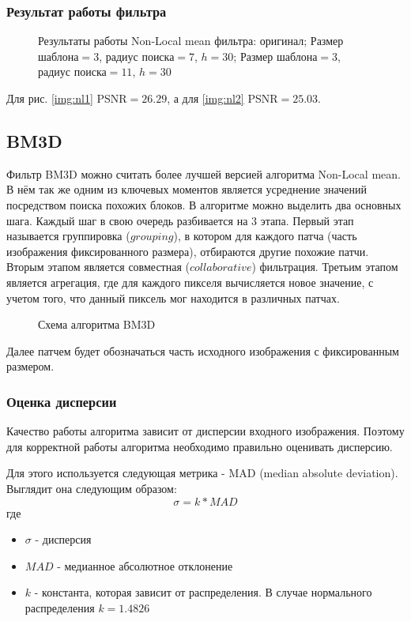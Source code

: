 \subsubsection{Результат работы фильтра}
\begin{figure}[H]
	\centering
	\hspace{0.0125ex}
	\subfigure[]{\texttt{[image: nl1]}
		\label{img:nl1}
	}
	\hspace{0.0125ex}
	\subfigure[]{\texttt{[image: nl2]}
		\label{img:nl2}
	}
	\caption{Результаты работы Non-Local mean фильтра:  оригинал;   Размер шаблона$=3$, радиус поиска$=7$, $h=30$;  Размер шаблона$=3$, радиус поиска$=11$, $h=30$}
	\label{img:nlRes}
\end{figure}
Для рис. \ref{img:nl1} PSNR$=26.29$, а для \ref{img:nl2} PSNR$=25.03$.

\subsection{BM3D}
Фильтр BM3D можно считать более лучшей версией алгоритма Non-Local mean. В нём так же одним из ключевых моментов является
усреднение значений посредством поиска похожих блоков. В алгоритме можно выделить два основных шага. Каждый шаг в свою очередь разбивается на 3 этапа. Первый этап называется группировка ($grouping$), в котором для каждого патча (часть изображения фиксированного размера), отбираются другие похожие патчи. Вторым этапом является совместная ($collaborative$) фильтрация. Третьим этапом является агрегация, где для каждого пикселя вычисляется новое значение, с учетом того, что данный пиксель мог находится в различных патчах\cite{Hasan2018}.
\begin{figure}[H]
	\caption{Схема алгоритма BM3D\cite{bm3dCircuit}}
\end{figure}
Далее патчем будет обозначаться часть исходного изображения с фиксированным размером.
\subsubsection{Оценка дисперсии}
Качество работы алгоритма зависит от дисперсии входного изображения. Поэтому для корректной работы алгоритма необходимо правильно оценивать дисперсию.

Для этого используется следующая метрика - MAD (median absolute deviation)\cite{mad}. Выглядит она следующим образом:
\begin{equation}
	\sigma = k * MAD
\end{equation}
где
\begin{itemize}
	\item $\sigma$ - дисперсия
	\item $MAD$ - медианное абсолютное отклонение
	\item $k$ - константа, которая зависит от распределения. В случае нормального распределения $k=1.4826$%
	
\end{itemize}
